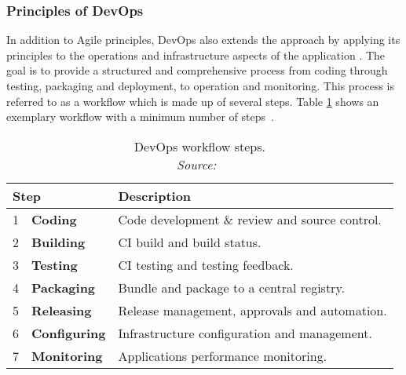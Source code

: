         \subsubsection{Principles of DevOps}\label{ssec::devops_princibles}
        In addition to Agile principles, DevOps also extends the  approach by applying its principles to the operations and infrastructure aspects of the application \cite{effective_devops}. The goal is to provide a structured and comprehensive process from coding through testing, packaging and deployment, to operation and monitoring. This process is referred to as a workflow which is made up of several steps. Table \ref{tab::devops_steps} shows an exemplary workflow with a minimum number of steps~\cite{base_devops}.

        \begin{table}[]
            \centering
            \begin{tabularx}{0.85\textwidth}{llX}
                \multicolumn{2}{l}{Step} & Description \\ \midrule\midrule
                1 & \textbf{Coding}& Code development \& review and source control.  \\
                2 & \textbf{Building}& \acs{CI} build and build status.  \\
                3 & \textbf{Testing}& \acs{CI} testing and testing feedback.  \\
                4 & \textbf{Packaging}& Bundle and package to a central registry.  \\
                5 & \textbf{Releasing}& Release management, approvals and automation.  \\
                6 & \textbf{Configuring}& Infrastructure configuration and management.  \\
                7 & \textbf{Monitoring}& Applications performance monitoring.  \\
            \end{tabularx}
            \caption{DevOps workflow steps. \\\textit{Source:~\cite{base_devops}}}
            \label{tab::devops_steps}
        \end{table}

